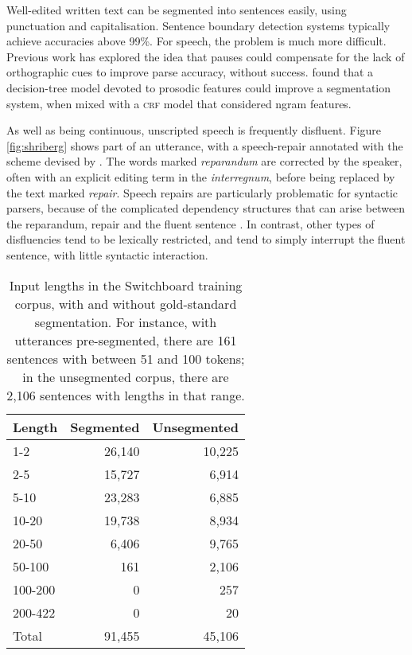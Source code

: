 \documentclass[11pt,letterpaper]{article}
\begin{document}
Well-edited written text can be segmented into sentences easily, using punctuation and
capitalisation.  Sentence boundary detection systems typically achieve accuracies
above 99\%.  For speech, the problem is much more difficult.  Previous work has
explored the idea that pauses could compensate
for the lack of orthographic cues \citep{gregory:04} to improve parse accuracy,
without success.  \citet{liu:05} found that a decision-tree model devoted to prosodic
features could improve a segmentation system, when mixed with a \textsc{crf} model that
considered ngram features.

As well as being continuous, unscripted speech is frequently disfluent.
Figure \ref{fig:shriberg} shows part of an utterance, with a speech-repair annotated
with the scheme devised by \citet{shriberg:94}.  The words marked \emph{reparandum}
are corrected by the speaker, often with an explicit editing term in the
\emph{interregnum}, before being replaced by the text marked \emph{repair}.
Speech repairs are particularly problematic for syntactic
parsers, because of the complicated dependency structures that can arise between the
reparandum, repair and the fluent sentence \citep{Johnson04a}.
In contrast, other types of disfluencies tend to be lexically restricted, and
tend to simply interrupt the fluent sentence, with little syntactic interaction.

\begin{table}
\centering
\small
\begin{tabular}{l|rr}
    \hline
    Length & Segmented & Unsegmented \\
    \hline \hline
    1-2 & 26,140 & 10,225 \\
    2-5 & 15,727 & 6,914 \\
    5-10 & 23,283 & 6,885 \\
    10-20 & 19,738 &  8,934 \\
    20-50 & 6,406 & 9,765 \\
    50-100 & 161 & 2,106 \\
    100-200 & 0 & 257 \\
    200-422 & 0 & 20 \\
    \hline
    Total & 91,455 & 45,106 \\
    \hline
\end{tabular}
\caption{\small Input lengths in the Switchboard training corpus, with and without
    gold-standard segmentation.  For instance, with utterances pre-segmented,
    there are 161 sentences with between 51 and 100 tokens; in the unsegmented
corpus, there are 2,106 sentences with lengths in that range.
\label{tab:seg_freqs}}
\vspace*{-3em}
\end{table}
\end{document}

